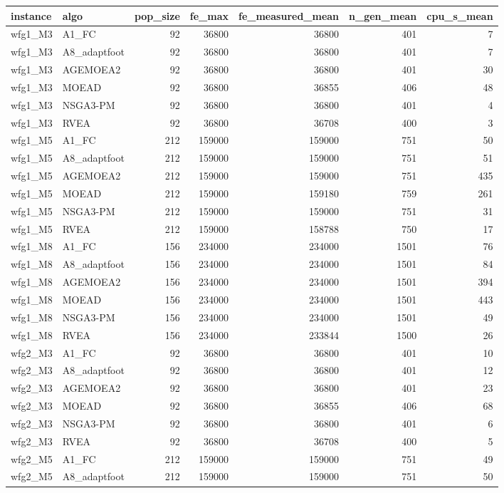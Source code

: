 \begin{tabular}{llrrrrr}
\toprule
instance & algo & pop_size & fe_max & fe_measured_mean & n_gen_mean & cpu_s_mean \\
\midrule
wfg1_M3 & A1_FC & 92 & 36800 & 36800 & 401 & 7 \\
wfg1_M3 & A8_adaptfoot & 92 & 36800 & 36800 & 401 & 7 \\
wfg1_M3 & AGEMOEA2 & 92 & 36800 & 36800 & 401 & 30 \\
wfg1_M3 & MOEAD & 92 & 36800 & 36855 & 406 & 48 \\
wfg1_M3 & NSGA3-PM & 92 & 36800 & 36800 & 401 & 4 \\
wfg1_M3 & RVEA & 92 & 36800 & 36708 & 400 & 3 \\
wfg1_M5 & A1_FC & 212 & 159000 & 159000 & 751 & 50 \\
wfg1_M5 & A8_adaptfoot & 212 & 159000 & 159000 & 751 & 51 \\
wfg1_M5 & AGEMOEA2 & 212 & 159000 & 159000 & 751 & 435 \\
wfg1_M5 & MOEAD & 212 & 159000 & 159180 & 759 & 261 \\
wfg1_M5 & NSGA3-PM & 212 & 159000 & 159000 & 751 & 31 \\
wfg1_M5 & RVEA & 212 & 159000 & 158788 & 750 & 17 \\
wfg1_M8 & A1_FC & 156 & 234000 & 234000 & 1501 & 76 \\
wfg1_M8 & A8_adaptfoot & 156 & 234000 & 234000 & 1501 & 84 \\
wfg1_M8 & AGEMOEA2 & 156 & 234000 & 234000 & 1501 & 394 \\
wfg1_M8 & MOEAD & 156 & 234000 & 234000 & 1501 & 443 \\
wfg1_M8 & NSGA3-PM & 156 & 234000 & 234000 & 1501 & 49 \\
wfg1_M8 & RVEA & 156 & 234000 & 233844 & 1500 & 26 \\
wfg2_M3 & A1_FC & 92 & 36800 & 36800 & 401 & 10 \\
wfg2_M3 & A8_adaptfoot & 92 & 36800 & 36800 & 401 & 12 \\
wfg2_M3 & AGEMOEA2 & 92 & 36800 & 36800 & 401 & 23 \\
wfg2_M3 & MOEAD & 92 & 36800 & 36855 & 406 & 68 \\
wfg2_M3 & NSGA3-PM & 92 & 36800 & 36800 & 401 & 6 \\
wfg2_M3 & RVEA & 92 & 36800 & 36708 & 400 & 5 \\
wfg2_M5 & A1_FC & 212 & 159000 & 159000 & 751 & 49 \\
wfg2_M5 & A8_adaptfoot & 212 & 159000 & 159000 & 751 & 50 \\

\end{tabular}
